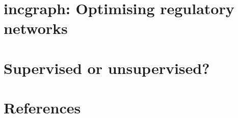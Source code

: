 \section{incgraph: Optimising regulatory networks}


\section{Supervised or unsupervised?}


\clearpage
\section{References}
\printbibliography[heading=none]
